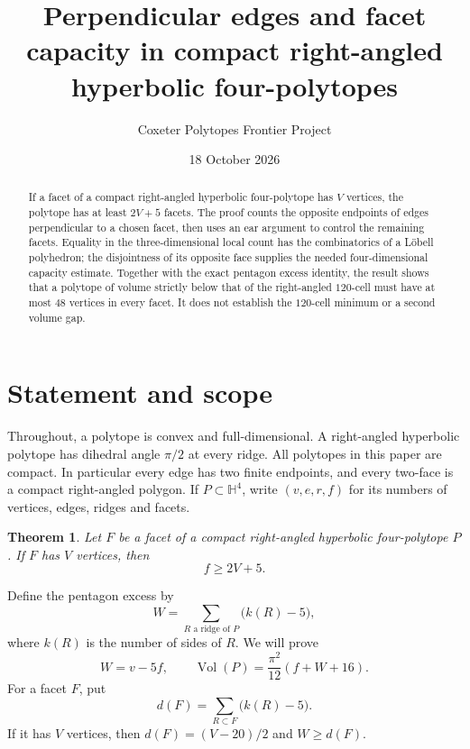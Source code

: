 \documentclass[11pt]{article}
\title{Perpendicular edges and facet capacity\linebreak
in compact right-angled hyperbolic four-polytopes}
\author{Coxeter Polytopes Frontier Project}
\date{18 October 2026}
\newtheorem{theorem}{Theorem}
\theoremstyle{remark}
\newcommand{\HH}{\mathbb H}
\newcommand{\Vol}{\operatorname{Vol}}
\begin{document}
\maketitle

\begin{abstract}
If a facet of a compact right-angled hyperbolic four-polytope has $V$
vertices, the polytope has at least $2V+5$ facets. The proof counts the
opposite endpoints of edges perpendicular to a chosen facet, then uses
an ear argument to control the remaining facets. Equality in the
three-dimensional local count has the combinatorics of a L\"obell
polyhedron; the disjointness of its opposite face supplies the needed
four-dimensional capacity estimate. Together with the exact pentagon
excess identity, the result shows that a polytope of volume strictly
below that of the right-angled $120$-cell must have at most $48$ vertices
in every facet. It does not establish the $120$-cell minimum or a second
volume gap.
\end{abstract}

\section{Statement and scope}

Throughout, a polytope is convex and full-dimensional. A right-angled
hyperbolic polytope has dihedral angle $\pi/2$ at every ridge. All
polytopes in this paper are compact. In particular every edge has two
finite endpoints, and every two-face is a compact right-angled polygon.
If $P\subset\HH^4$, write $(v,e,r,f)$ for its numbers of vertices,
edges, ridges and facets.

\begin{theorem}\label{thm:capacity}
Let $F$ be a facet of a compact right-angled hyperbolic four-polytope
$P$. If $F$ has $V$ vertices, then
\begin{equation}\label{eq:capacity}
 f\ge 2V+5.
\end{equation}
\end{theorem}

Define the pentagon excess by
\[
 W=\sum_{R\text{ a ridge of }P}\bigl(k(R)-5\bigr),
\]
where $k(R)$ is the number of sides of $R$. We will prove
\begin{equation}\label{eq:volume}
 W=v-5f,\qquad
 \Vol(P)=\frac{\pi^2}{12}(f+W+16).
\end{equation}
For a facet $F$, put
\[
 d(F)=\sum_{R\subset F}\bigl(k(R)-5\bigr).
\]
If it has $V$ vertices, then $d(F)=(V-20)/2$ and $W\ge d(F)$.
\end{document}
